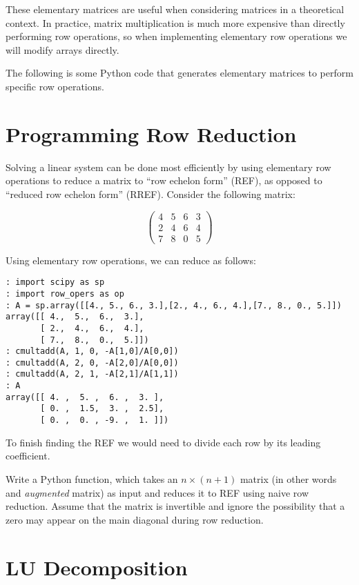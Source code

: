 These elementary matrices are useful when considering matrices in a theoretical context.
In practice, matrix multiplication is much more expensive than directly performing row operations, so when implementing elementary row operations we will modify arrays directly.

The following is some Python code that generates elementary matrices to perform specific row operations.


\section*{Programming Row Reduction}

Solving a linear system can be done most efficiently by using elementary row operations to reduce a matrix to ``row echelon form'' (REF), as opposed to ``reduced row echelon form'' (RREF).
Consider the following matrix: 

\[
\begin{pmatrix}
4&5&6&3 \\
2&4&6&4 \\
7&8&0&5
\end{pmatrix}
\]

Using elementary row operations, we can reduce as follows:
\begin{lstlisting}
: import scipy as sp
: import row_opers as op
: A = sp.array([[4., 5., 6., 3.],[2., 4., 6., 4.],[7., 8., 0., 5.]])
array([[ 4.,  5.,  6.,  3.],
       [ 2.,  4.,  6.,  4.],
       [ 7.,  8.,  0.,  5.]])
: cmultadd(A, 1, 0, -A[1,0]/A[0,0])
: cmultadd(A, 2, 0, -A[2,0]/A[0,0])
: cmultadd(A, 2, 1, -A[2,1]/A[1,1])
: A
array([[ 4. ,  5. ,  6. ,  3. ],
       [ 0. ,  1.5,  3. ,  2.5],
       [ 0. ,  0. , -9. ,  1. ]])
\end{lstlisting}

To finish finding the REF we would need to divide each row by its leading coefficient.

\begin{problem}
\label{prob:REF}
Write a Python function, which takes an $n\times (n+1)$ matrix (in other words and \emph{augmented} matrix) as input and reduces it to REF using naive row reduction.
Assume that the matrix is invertible and ignore the possibility that a zero may appear on the main diagonal during row reduction.
\end{problem}

\section*{LU Decomposition}

